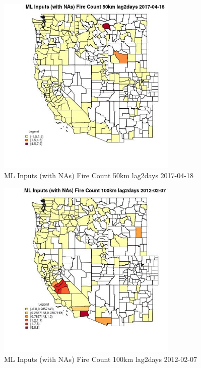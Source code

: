\begin{figure} 
\centering  
\includegraphics[width=0.77\textwidth]{Code_Outputs/Report_ML_input_PM25_Step4_part_f_de_duplicated_aves_prioritize_24hr_obswNAs_CountyFire_Count_50km_lag2daysMean2017-04-18.jpg} 
\caption{\label{fig:Report_ML_input_PM25_Step4_part_f_de_duplicated_aves_prioritize_24hr_obswNAsCountyFire_Count_50km_lag2daysMean2017-04-18}ML Inputs (with NAs) Fire Count 50km lag2days 2017-04-18} 
\end{figure} 
 

\clearpage 

\begin{figure} 
\centering  
\includegraphics[width=0.77\textwidth]{Code_Outputs/Report_ML_input_PM25_Step4_part_f_de_duplicated_aves_prioritize_24hr_obswNAs_CountyFire_Count_100km_lag2daysMean2012-02-07.jpg} 
\caption{\label{fig:Report_ML_input_PM25_Step4_part_f_de_duplicated_aves_prioritize_24hr_obswNAsCountyFire_Count_100km_lag2daysMean2012-02-07}ML Inputs (with NAs) Fire Count 100km lag2days 2012-02-07} 
\end{figure} 
 

